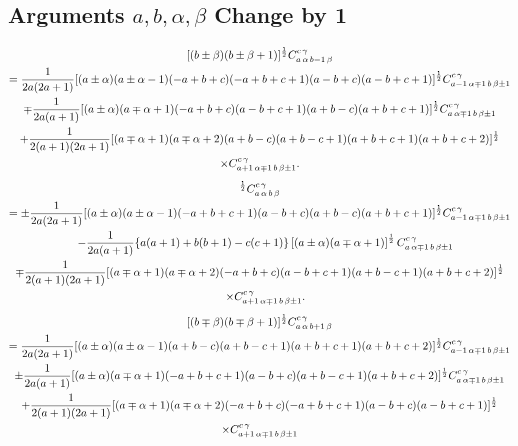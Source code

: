 \subsection{Arguments $a, b, \alpha, \beta$ Change by 1}\label{sec:8.6.6}
\begin{multline}
{[(b \pm \beta)(b \pm \beta+1)]^{\frac{1}{2}} C_{a\,\alpha\,b-1\,\beta}^{c\,\gamma}}  \\
=\frac{1}{2 a(2 a+1)}[(a \pm \alpha)(a \pm \alpha-1)(-a+b+c)(-a+b+c+1)(a-b+c)(a-b+c+1)]^{\frac{1}{2}} C_{a-1\,\alpha \mp 1\,b\,\beta \pm 1}^{c\,\gamma}  \\
\mp \frac{1}{2 a(a+1)}[(a \pm \alpha)(a \mp \alpha+1)(-a+b+c)(a-b+c+1)(a+b-c)(a+b+c+1)]^{\frac{1}{2}} C_{a\,\alpha \mp 1\,b\,\beta \pm 1}^{c\,\gamma}  \\
+\frac{1}{2(a+1)(2 a+1)}[(a \mp \alpha+1)(a \mp \alpha+2)(a+b-c)(a+b-c+1)(a+b+c+1)(a+b+c+2)]^{\frac{1}{2}}  \\
\times C_{a+1\,\alpha \mp 1\,b\,\beta \pm 1}^{c\,\gamma} . \label{eq:8:6:28}
\end{multline}
\begin{multline}
[(b\mp\beta)(b\pm\beta+1)]^{\frac{1}{2}}\clebsch{a}{\alpha}{b}{\beta}{c}{\gamma}\\
= \pm \frac{1}{2 a(2 a+1)}[(a \pm \alpha)(a \pm \alpha-1)(-a+b+c+1)(a-b+c)(a+b-c)(a+b+c+1)]^{\frac{1}{2}} \clebsch{a-1}{\alpha \mp 1}{b}{\beta \pm 1}{c}{\gamma}  \\
\quad-\frac{1}{2 a(a+1)}\{a(a+1)+b(b+1)-c(c+1)\}\left[(a \pm \alpha)(a \mp \alpha+1)\right]^{\frac{1}{2}} \clebsch{a}{\alpha \mp 1}{b}{\beta \pm 1}{c}{\gamma}  \\
\mp \frac{1}{2(a+1)(2 a+1)}[(a \mp \alpha+1)(a \mp \alpha+2)(-a+b+c)(a-b+c+1)(a+b-c+1)(a+b+c+2)]^{\frac{1}{2}}  \\
\quad \times \clebsch{a+1}{\alpha \mp 1}{b}{\beta \pm 1}{c}{\gamma} . \label{eq:8:6:29}
\end{multline}
\begin{multline}
{[(b \mp \beta)(b \mp \beta+1)]^{\frac{1}{2}} C_{a\,\alpha\,b+1\,\beta}^{c\,\gamma}}  \\
=\frac{1}{2 a(2 a+1)}[(a \pm \alpha)(a \pm \alpha-1)(a+b-c)(a+b-c+1)(a+b+c+1)(a+b+c+2)]^{\frac{1}{2}} C_{a-1\,\alpha \mp 1\,b\,\beta \pm 1}^{c\,\gamma}  \\
\pm \frac{1}{2 a(a+1)}[(a \pm \alpha)(a \mp \alpha+1)(-a+b+c+1)(a-b+c)(a+b-c+1)(a+b+c+2)]^{\frac{1}{2}} C_{a\,\alpha \mp 1\,b\,\beta \pm 1}^{c\,\gamma}  \\
+\frac{1}{2(a+1)(2 a+1)}[(a \mp \alpha+1)(a \mp \alpha+2)(-a+b+c)(-a+b+c+1)(a-b+c)(a-b+c+1)]^{\frac{1}{2}}  \\
\times C_{a+1\,\alpha \mp 1\,b\,\beta \pm 1}^{c\,\gamma} \label{eq:8:6:30}
\end{multline}
